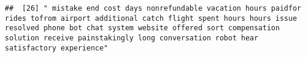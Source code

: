 \documentclass[
]{article}
\begin{document}
\begin{verbatim}
##  [26] " mistake end cost days nonrefundable vacation hours paidfor rides tofrom airport additional catch flight spent hours hours issue resolved phone bot chat system website offered sort compensation solution receive painstakingly long conversation robot hear satisfactory experience"                                                                                                                                                                                                                                                                                                                                                                                                                                                                                                                                                                                                                                                                                                                                                                                                                                                                                                                                                                                                                                                                                                                                                                                                                                                                                                                                                                                                                                                                                                         

\end{verbatim}
\end{document}
